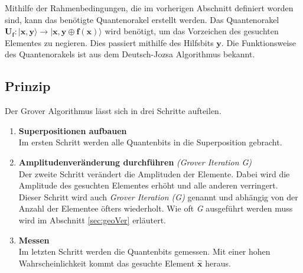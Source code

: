 Mithilfe der Rahmenbedingungen, die im vorherigen Abschnitt definiert worden sind, kann das benötigte Quantenorakel erstellt werden. Das Quantenorakel $\mathbf{U_f : | x,y \rangle \to |x,y \oplus f(x) \rangle}$ wird benötigt, um das Vorzeichen des gesuchten Elementes zu negieren. Dies passiert mithilfe des Hilfsbits $\mathbf{y}$. Die Funktionsweise des Quantenorakels ist aus dem Deutsch-Jozsa Algorithmus bekannt.

\subsection{Prinzip}
Der Grover Algorithmus lässt sich in drei Schritte aufteilen.
\begin{enumerate}
	\item \textbf{Superpositionen aufbauen}
	\\
	Im ersten Schritt werden alle Quantenbits in die Superposition gebracht.
	\item \textbf{Amplitudenveränderung durchführen} \emph{(Grover Iteration G)}
	\\
	Der zweite Schritt verändert die Amplituden der Elemente. Dabei wird die Amplitude des gesuchten Elementes erhöht und alle anderen verringert. Dieser Schritt wird auch \emph{Grover Iteration (G)} genannt und abhängig von der Anzahl der Elementee öfters wiederholt. Wie oft \emph{G} ausgeführt werden muss wird im Abschnitt \ref{sec:geoVer} erläutert.
	\item \textbf{Messen} 
	\\
	Im letzten Schritt werden die Quantenbits gemessen. Mit einer hohen Wahrscheinlichkeit kommt das gesuchte Element $\mathbf{\hat x}$ heraus.
\end{enumerate}

